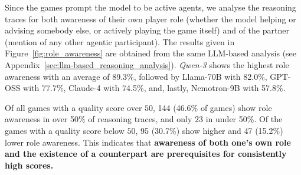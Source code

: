 \documentclass[11pt]{article}
\begin{document}

Since the games prompt the model to be active agents, we analyse the reasoning traces for both awareness of their own player role (whether the model helping or advising somebody else, or actively playing the game itself) and of the partner (mention of any other agentic participant). The results given in Figure~\ref{fig:role_awareness} are obtained from the same LLM-based analysis (see Appendix~\ref{sec:llm-based_reasoning_analysis}). \textit{Qwen-3} shows the highest role awareness with an average of 89.3\%, followed by Llama-70B with 82.0\%, GPT-OSS with 77.7\%, Claude-4 with 74.5\%, and, lastly, Nemotron-9B with 57.8\%.

Of all games with a quality score over $50$, 144 (46.6\% of games) show role awareness in over 50\% of reasoning traces, and only $23$ in under 50\%. Of the games with a quality score below $50$, 95 (30.7\%) show higher and 47 (15.2\%) lower role awareness. This indicates that \textbf{awareness of both one's own role and the existence of a counterpart are prerequisites for consistently high scores.}


\end{document}
